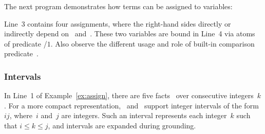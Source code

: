 \begin{example}\label{ex:assign}
The next program demonstrates how terms can be assigned to variables:%
%

%
Line~3 contains four assignments, where the right-hand sides directly or indirectly
depend on~ and~.
These two variables are bound in Line~4 via atoms of predicate /$1$.
Also observe the different usage and role of built-in comparison predicate~\code{==}.
\eexample
\end{example}


\subsubsection{Intervals}\label{subsec:gringo:interval}

In Line~1 of Example~\ref{ex:assign},
there are five facts~
over consecutive integers~$k$.
For a more compact representation,
\gringo\ and \clingo\ support integer intervals of the form $i$$j$,
where~$i$ and~$j$ are integers.
Such an interval represents each integer~$k$ such that $i\leq k\leq j$,
and intervals are expanded during grounding.

